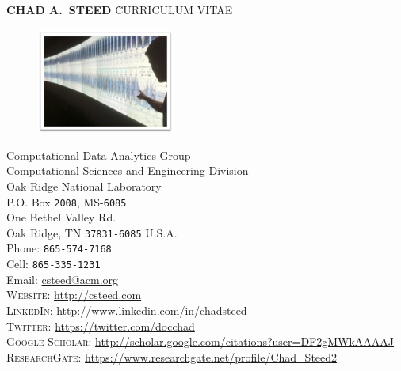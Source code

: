 \documentclass[11pt, a4paper]{article}
\begin{document}
\thispagestyle{firststyle}



\begin{tabbing}
    {\sffamily \LARGE \textbf{CHAD A.\ STEED}} \` {\sffamily \LARGE CURRICULUM VITAE}
\end{tabbing}


\begin{figure}
  \vspace{-30pt}
  \begin{center}
    \includegraphics[width=0.4\textwidth]{climate-framed.png}
  \end{center}
  \vspace{-20pt}
\end{figure}

Computational Data Analytics Group\\
Computational Sciences and Engineering Division\\
Oak Ridge National Laboratory\\
P.O. Box \texttt{2008}, MS-\texttt{6085}\\
One Bethel Valley Rd.\\
Oak Ridge, TN \texttt{37831-6085}
U.S.A.\\[.2cm]
Phone: \texttt{865-574-7168}\\
Cell: \texttt{865-335-1231}\\
Email: \href{mailto:csteed@acm.org}{csteed@acm.org}\\[.2cm]
\textsc{Website}: \href{http://csteed.com}{http://csteed.com}\\
\textsc{LinkedIn}: \href{http://www.linkedin.com/in/chadsteed}{http://www.linkedin.com/in/chadsteed}\\
\textsc{Twitter}: \href{https://twitter.com/docchad}{https://twitter.com/docchad}\\
\textsc{Google Scholar}: \href{http://scholar.google.com/citations?user=DF2gMWkAAAAJ}{http://scholar.google.com/citations?user=DF2gMWkAAAAJ}\\
\textsc{ResearchGate}: \href{https://www.researchgate.net/profile/Chad\_Steed2}{https://www.researchgate.net/profile/Chad\_Steed2}
\end{document}
